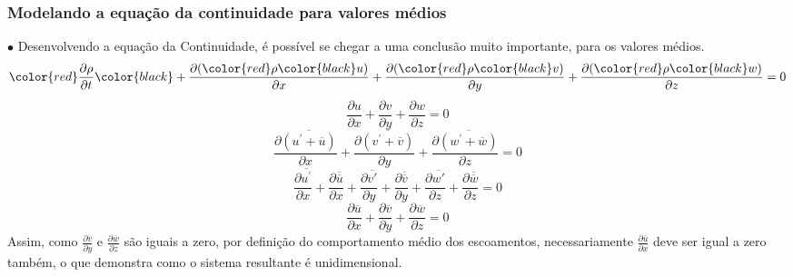 \documentclass[xcolor=dvipsnames,10pt,aspectratio=169]{beamer}
\begin{document}
		
		
		
		
		\begin{frame}
			\frametitle{Modelando a equação da continuidade para valores médios}
			$\bullet$ Desenvolvendo a equação da Continuidade, é possível se chegar a uma conclusão muito importante, para os valores médios.
			\begin{equation*}
			\color{red}\frac{\partial \rho}{\partial t} \color{black}+  \frac{\partial (\color{red}\rho \color{black}u)}{\partial x} + \frac{\partial (\color{red} \rho \color{black}v)}{\partial y} + \frac{\partial (\color{red}\rho \color{black}w)}{\partial z} = 0
			\end{equation*}
			\begin{equation}
			\frac{\partial u}{\partial x} + \frac{\partial v}{\partial y} + \frac{\partial w}{\partial z} = 0
			\end{equation}
			\begin{equation}
			\frac{\partial \overline{(u^\prime + \overline{u})}}{\partial x} + \frac{\partial \overline{(v^\prime + \overline{v})}}{\partial y} + \frac{\partial \overline{(w^\prime + \overline{w})}}{\partial z} = 0
			\end{equation}
			\begin{equation}
			\frac{\partial \overline{u^\prime}}{\partial x} +\frac{\partial \overline{\overline{u}}}{\partial x} + \frac{\partial \overline{v\prime}}{\partial y} +\frac{\partial \overline{\overline{v}}}{\partial y} + \frac{\partial \overline{w\prime}}{\partial z} +\frac{\partial \overline{\overline{w}}}{\partial z} = 0
			\end{equation}
			\begin{equation}
			\frac{\partial {\overline{u}}}{\partial x} +\frac{\partial {\overline{v}}}{\partial y} +\frac{\partial {\overline{w}}}{\partial z} = 0
			\end{equation}
			Assim, como $ \frac{\partial {\overline{v}}}{\partial y} $ e $ \frac{\partial {\overline{w}}}{\partial z}$ são iguais a zero, por definição do comportamento médio dos escoamentos, necessariamente $\frac{\partial {\overline{u}}}{\partial x}$ deve ser igual a zero também, o que demonstra como o sistema resultante é unidimensional.
		\end{frame}
		
		
		
\end{document}
